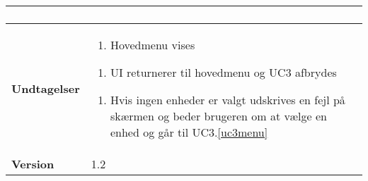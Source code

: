 \begin{table}[H]
\begin{tabular}{|p{6cm}|p{8cm}|}
\begin{enumerate}
	\end{enumerate} \\ \hline

		\textbf{Undtagelser}	
		
		&\begin{enumerate}[label= \ref{uc3login}a.]
			\item Hovedmenu vises
		\end{enumerate}
						
		\begin{enumerate}[label= \ref{uc3deact}a.]
			\item UI returnerer til hovedmenu og UC3 afbrydes
		\end{enumerate}						
							
		\begin{enumerate}[label= \ref{uc3sysdeact}a.]
			\item Hvis ingen enheder er valgt udskrives en fejl på skærmen og beder brugeren om at vælge en enhed og går til UC3.\ref{uc3menu}
		\end{enumerate} \\\hline
											
		\textbf{Version}		&1.2 \\\hline
		
	\end{tabular} 
\end{table}